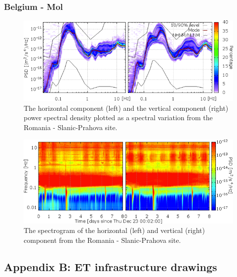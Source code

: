\subsubsection*{Belgium - Mol}
\begin{figure}[h]
\centering
\includegraphics[width=\textwidth]{./Sec_SiteInfra/Figures/results/Mol-A_multiplot1}
\caption{The horizontal component (left) and the vertical component (right) power spectral density plotted as a spectral variation from the Romania - Slanic-Prahova site.}
\label{fig:Slanic-A_multiplot1}
\end{figure}\begin{figure}[h]
\centering
\includegraphics[width=\textwidth]{./Sec_SiteInfra/Figures/results/Mol-A_multiplot2}
\caption{The spectrogram of the horizontal (left) and vertical (right) component from the Romania - Slanic-Prahova site.}
\label{fig:Slanic-A_multiplot2}
\end{figure}
\FloatBarrier
\subsection{Appendix B: ET infrastructure drawings}


